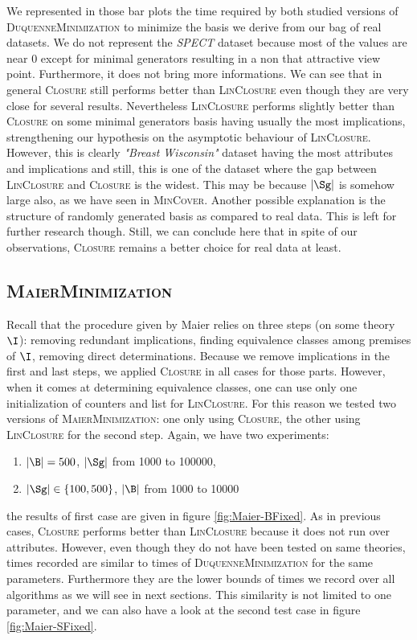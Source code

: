 We represented in those bar plots the time required by both studied versions of \textsc{DuquenneMinimization} to minimize the basis we derive from our bag of real datasets. We do not represent the \textit{SPECT} dataset because most of the values
are near 0 except for minimal generators resulting in a non that attractive view point. Furthermore, it does not bring more informations. We can see that in general
\textsc{Closure} still performs better than \textsc{LinClosure} even though they are very close for several results. Nevertheless \textsc{LinClosure} performs slightly better than \textsc{Closure} on some minimal generators basis having usually the most implications, strengthening our hypothesis on the asymptotic behaviour of \textsc{LinClosure}. However, this is clearly \textit{"Breast Wisconsin"} dataset having the most attributes and implications and still, this is one of the dataset where the gap between \textsc{LinClosure} and \textsc{Closure} is the widest. This may be because $|\Sg|$ is somehow large
also, as we have seen in \textsc{MinCover}. Another possible explanation is the structure of randomly generated basis as compared to real data. This is left for further research though. Still, we can conclude here that 
in spite of our observations, \textsc{Closure} remains a better choice for real data at least. 

\subsection{\textsc{MaierMinimization}}

Recall that the procedure given by Maier relies on three steps (on some theory $\I$): removing redundant implications, finding equivalence classes among premises of $\I$, removing direct determinations. Because we remove implications in the first and last steps, we applied \textsc{Closure} in all cases for those
parts. However, when it comes at determining equivalence classes, one can use
only one initialization of counters and list for \textsc{LinClosure}. For this
reason we tested two versions of \textsc{MaierMinimization}: one only using \textsc{Closure}, the other using \textsc{LinClosure} for the second step.
Again, we have two experiments:
\begin{enumerate}
	\item $|\B| = 500$, $|\Sg|$ from 1000 to 100000,
	\item $|\Sg| \in \{ 100, 500\}$, $|\B|$ from 1000 to 10000
\end{enumerate}
\noindent the results of first case are given in figure \ref{fig:Maier-BFixed}.
As in previous cases, \textsc{Closure} performs better than \textsc{LinClosure}
because it does not run over attributes. However, even though they do not have
been tested on same theories, times recorded are similar to times of \textsc{DuquenneMinimization} for the same parameters. Furthermore they are
the lower bounds of times we record over all algorithms as we will see in
next sections. This similarity is not limited to one parameter, and we can
also have a look at the second test case in figure \ref{fig:Maier-SFixed}.

